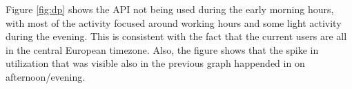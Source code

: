 

Figure \ref{fig:dp} shows the API not being used during the early morning hours, with most of the activity focused around working hours and some light activity during the evening. This is consistent with the fact that the current users are all in the central European timezone. Also, the figure shows that the spike in utilization that was visible also in the previous graph happended in on afternoon/evening.






